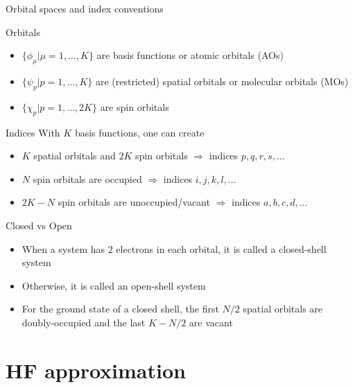 \documentclass[aspectratio=169,9pt]{beamer}
\newcommand{\red}[1]{\textcolor{hfRed}{#1}}
\newcommand{\orange}[1]{\textcolor{hfOrange}{#1}}
\newcommand{\green}[1]{\textcolor{hfGreen}{#1}}
\newcommand{\violet}[1]{\textcolor{hfViolet}{#1}}
\begin{document}
\begin{frame}{Orbital spaces and index conventions}
	\begin{block}{Orbitals}
		\begin{itemize}
			\item $\{ \phi_{\mu} | \mu=1,\ldots,K \}$ are \green{basis functions} or \green{atomic orbitals (AOs)}
			\item $\{ \psi_p | p=1,\ldots,K \}$ are \violet{(restricted) spatial orbitals} or \violet{molecular orbitals (MOs)}
			\item $\{ \chi_p | p=1,\ldots,2K \}$ are \orange{spin orbitals}
		\end{itemize}
	\end{block}
	\begin{block}{Indices}
		With $K$ \green{basis functions}, one can create 
		\begin{itemize}
			\item $K$ \violet{spatial orbitals} and $2K$ \orange{spin orbitals} 
			\hspace{0.045\textwidth} $\Rightarrow$ \red{indices $p,q,r,s,\ldots$} 
			\item $N$ \orange{spin orbitals} are \red{occupied} 
			\hspace{0.13\textwidth} $\Rightarrow$ \red{indices $i,j,k,l,\ldots$} 
			\item $2K-N$ \orange{spin orbitals} are \red{unoccupied/vacant} 
			$\Rightarrow$ \red{indices $a,b,c,d,\ldots$}
		\end{itemize}
	\end{block}
	\begin{block}{Closed vs Open}
		\begin{itemize}
			\item When a system has \red{$2$ electrons in each orbital}, it is called a \red{closed-shell} system 
			\item Otherwise, it is called an \red{open-shell} system 
			\item For the ground state of a closed shell, the first $N/2$ spatial orbitals are \red{doubly-occupied} and the last $K-N/2$ are \red{vacant}
		\end{itemize}
	\end{block}
\end{frame}

\section{HF approximation}
\end{document}
